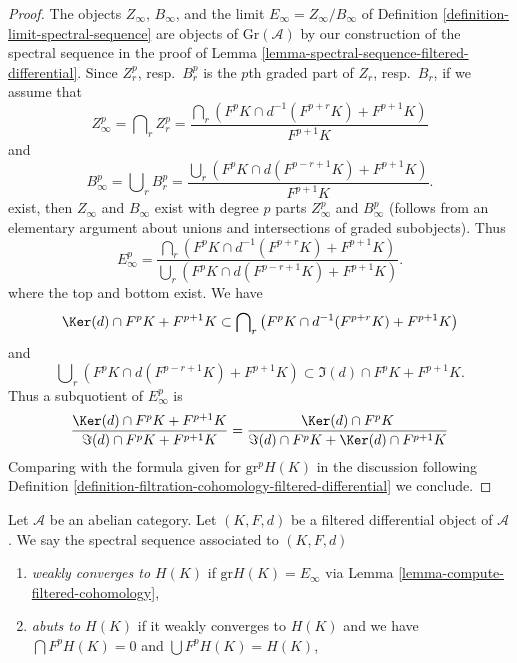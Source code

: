 \begin{proof}
The objects $Z_\infty$, $B_\infty$, and the limit
$E_\infty = Z_\infty/B_\infty$ of
Definition \ref{definition-limit-spectral-sequence}
are objects of $\text{Gr}(\mathcal{A})$ by our construction of
the spectral sequence in the proof of
Lemma \ref{lemma-spectral-sequence-filtered-differential}.
Since $Z_r^p$, resp.\ $B_r^p$ is the $p$th graded part of $Z_r$, resp.\  $B_r$,
if we assume that
$$
Z_\infty^p = \bigcap\nolimits_r Z_r^p =
\frac{\bigcap_r (F^pK \cap d^{-1}(F^{p + r}K) + F^{p + 1}K)}{F^{p + 1}K}
$$
and
$$
B_\infty^p = \bigcup\nolimits_r B_r^p =
\frac{\bigcup_r (F^pK \cap d(F^{p - r + 1}K) + F^{p + 1}K)}{F^{p + 1}K}.
$$
exist, then $Z_\infty$ and $B_\infty$ exist with degree $p$ parts
$Z_\infty^p$ and $B_\infty^p$ (follows from an elementary argument
about unions and intersections of graded subobjects). Thus
$$
E_\infty^p =
\frac{\bigcap_r (F^pK \cap d^{-1}(F^{p + r}K) + F^{p + 1}K)}
{\bigcup_r (F^pK \cap d(F^{p - r + 1}K) + F^{p + 1}K)}.
$$
where the top and bottom exist. We have
\begin{equation}
\label{equation-on-top}
\Ker(d) \cap F^pK + F^{p + 1}K
\subset
\bigcap\nolimits_r \left(F^pK \cap d^{-1}(F^{p + r}K) + F^{p + 1}K\right)
\end{equation}
and
\begin{equation}
\label{equation-at-bottom}
\bigcup\nolimits_r \left(F^pK \cap d(F^{p - r + 1}K) + F^{p + 1}K\right)
\subset
\Im(d) \cap F^pK + F^{p + 1}K.
\end{equation}
Thus a subquotient of $E_\infty^p$ is
$$
\frac{\Ker(d) \cap F^pK + F^{p + 1}K}{\Im(d) \cap F^pK + F^{p + 1}K} =
\frac{\Ker(d) \cap F^pK}{\Im(d) \cap F^pK + \Ker(d) \cap F^{p + 1}K}
$$
Comparing with the formula given for $\text{gr}^pH(K)$ in the discussion
following
Definition \ref{definition-filtration-cohomology-filtered-differential}
we conclude.
\end{proof}

\begin{definition}
\label{definition-filtered-differential-ss-converges}
Let $\mathcal{A}$ be an abelian category.
Let $(K, F, d)$ be a filtered differential object of $\mathcal{A}$.
We say the spectral sequence associated to $(K, F, d)$
\begin{enumerate}
\item {\it weakly converges to $H(K)$} if $\text{gr}H(K) = E_{\infty}$
via Lemma \ref{lemma-compute-filtered-cohomology},
\item {\it abuts to $H(K)$} if it weakly converges to $H(K)$ and
we have $\bigcap F^pH(K) = 0$ and $\bigcup F^pH(K) = H(K)$,
\end{enumerate}
\end{definition}

